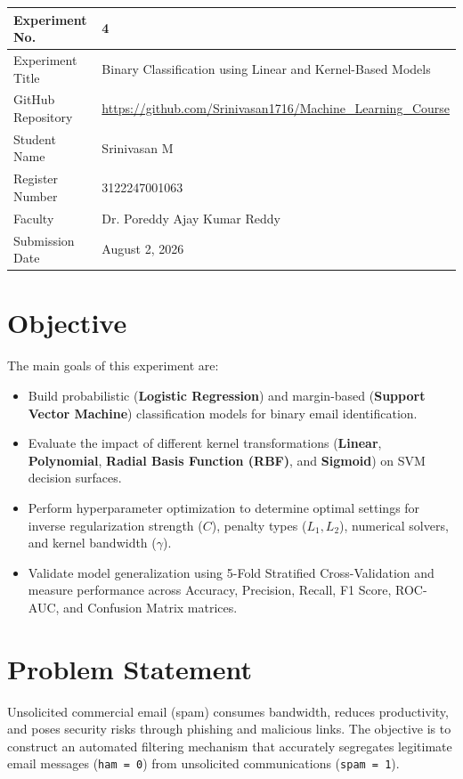 \documentclass[12pt,a4paper]{article}
\begin{document}
\begin{tabular}{|p{4cm}|p{11cm}|}
\hline
Experiment No. & 4 \\ \hline
Experiment Title & Binary Classification using Linear and Kernel-Based Models \\ \hline
GitHub Repository & \url{https://github.com/Srinivasan1716/Machine_Learning_Course} \\ \hline
Student Name & Srinivasan M \\ \hline
Register Number & 3122247001063 \\ \hline
Faculty & Dr. Poreddy Ajay Kumar Reddy \\ \hline
Submission Date & August 2, 2026 \\ \hline
\end{tabular}

\vspace{0.3cm}

\section{Objective}
The main goals of this experiment are:
\begin{itemize}[noitemsep]
    \item Build probabilistic (\textbf{Logistic Regression}) and margin-based (\textbf{Support Vector Machine}) classification models for binary email identification.
    \item Evaluate the impact of different kernel transformations (\textbf{Linear}, \textbf{Polynomial}, \textbf{Radial Basis Function (RBF)}, and \textbf{Sigmoid}) on SVM decision surfaces.
    \item Perform hyperparameter optimization to determine optimal settings for inverse regularization strength ($C$), penalty types ($L_1, L_2$), numerical solvers, and kernel bandwidth ($\gamma$).
    \item Validate model generalization using 5-Fold Stratified Cross-Validation and measure performance across Accuracy, Precision, Recall, F1 Score, ROC-AUC, and Confusion Matrix matrices.
\end{itemize}

\section{Problem Statement}
Unsolicited commercial email (spam) consumes bandwidth, reduces productivity, and poses security risks through phishing and malicious links. The objective is to construct an automated filtering mechanism that accurately segregates legitimate email messages (\texttt{ham = 0}) from unsolicited communications (\texttt{spam = 1}).
\end{document}
